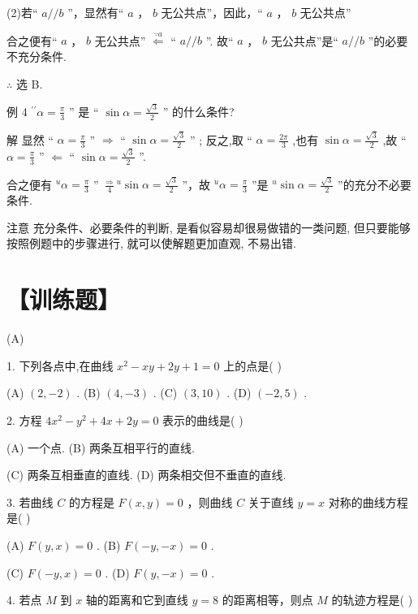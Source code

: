 \documentclass[10pt]{article}
\begin{document}
(2)若“ \(a//b\) ”，显然有“ \(a\) ， \(b\) 无公共点”，因此，“ \(a\) ， \(b\) 无公共点”

合之便有“ \(a\) ， \(b\) 无公共点” \(\overset{\because a}{ \Leftarrow  }\) “ \(a//b\) ”. 故“ \(a\) ， \(b\) 无公共点”是“ \(a//b\) ”的必要不充分条件.

\(\therefore\) 选 B.

例 4 \({}^{\prime \prime }\alpha  = \frac{\pi }{3}\) ” 是 “ \(\sin \alpha  = \frac{\sqrt{3}}{2}\) ” 的什么条件?

解 显然 “ \(\alpha  = \frac{\pi }{3}\) ” \(\Rightarrow\) “ \(\sin \alpha  = \frac{\sqrt{3}}{2}\) ” ; 反之,取 “ \(\alpha  = \frac{2\pi }{3}\) ,也有 \(\sin \alpha  = \frac{\sqrt{3}}{2}\) ,故 “ \(\alpha  = \frac{\pi }{3}\) ” \(\Leftarrow\) “ \(\sin \alpha  = \frac{\sqrt{3}}{2}\) ”.

合之便有 \({}^{u}\alpha  = \frac{\pi }{3}\) ” \(\frac{ \Rightarrow  }{4}{}^{u}\sin \alpha  = \frac{\sqrt{3}}{2}\) ”，故 \({}^{u}\alpha  = \frac{\pi }{3}\) ”是 \({}^{u}\sin \alpha  = \frac{\sqrt{3}}{2}\) ”的充分不必要条件.

注意 充分条件、必要条件的判断, 是看似容易却很易做错的一类问题, 但只要能够按照例题中的步骤进行, 就可以使解题更加直观, 不易出错.

\section*{【训练题】}

(A)

1. 下列各点中,在曲线 \({x}^{2} - {xy} + {2y} + 1 = 0\) 上的点是( )

(A) \(\left( {2, - 2}\right)\) . (B) \(\left( {4, - 3}\right)\) . (C) \(\left( {3,{10}}\right)\) . (D) \(\left( {-2,5}\right)\) .

2. 方程 \(4{x}^{2} - {y}^{2} + {4x} + {2y} = 0\) 表示的曲线是( )

(A) 一个点. (B) 两条互相平行的直线.

(C) 两条互相垂直的直线. (D) 两条相交但不垂直的直线.

3. 若曲线 \(C\) 的方程是 \(F\left( {x,y}\right)  = 0\) ，则曲线 \(C\) 关于直线 \(y = x\) 对称的曲线方程是( )

(A) \(F\left( {y,x}\right)  = 0\) . (B) \(F\left( {-y, - x}\right)  = 0\) .

(C) \(F\left( {-y,x}\right)  = 0\) . (D) \(F\left( {y, - x}\right)  = 0\) .

4. 若点 \(M\) 到 \(x\) 轴的距离和它到直线 \(y = 8\) 的距离相等，则点 \(M\) 的轨迹方程是( )
\end{document}
